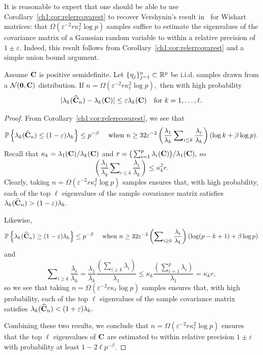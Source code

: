 It is reasonable to expect that one should be able to use Corollary~\ref{ch1:cor:relerrcovarest} 
to recover Vershynin's result in~\cite{Ver10} for Wishart 
matrices: that $\Omega(\varepsilon^{-2} r \kappa_\ell^2 \log p)$ samples suffice to estimate the 
eigenvalues of the covariance matrix of a Gaussian random variable to within a relative precision of 
$1 \pm \varepsilon.$ Indeed, this result follows
from Corollary~\ref{ch1:cor:relerrcovarest} and a simple union bound argument.

\begin{cor}
Assume $\mathbf{C}$ is positive semidefinite. Let $\{\mathbf{\eta}_j\}_{j=1}^n \subset
\mathbb{R}^p$ be i.i.d. samples drawn from a $\mathcal{N}(\mathbf{0}, \mathbf{C})$
distribution. If $n = \Omega(\varepsilon^{-2} r \kappa_\ell^2 \log p),$ then with high probability
\[
|\lambda_k(\widehat{\mathbf{C}}_n) - \lambda_k(\mathbf{C})| \leq \varepsilon
\lambda_k(\mathbf{C}) \quad \text{for } k=1, \ldots,\ell.
\]
\label{ch1:cor:examplecovarest}
\end{cor}

\begin{proof}
 From Corollary~\ref{ch1:cor:relerrcovarest}, we see that 
 \[
  \mathbb{P}\left\{\lambda_k(\widehat{\mathbf{C}}_n) \leq (1-\varepsilon) \lambda_k\right\} \leq p^{-\beta} 
  \quad \text{ when } n \geq 32 \varepsilon^{-2} 
  \left(\frac{\lambda_1}{\lambda_k} \sum\nolimits_{i \leq k} \frac{\lambda_i}{\lambda_k} \right)
  (\log k + \beta \log p).
 \]
Recall that $\kappa_k = \lambda_1(\mathbf{C})/\lambda_k(\mathbf{C})$ and 
$r = \big(\sum_{i=1}^p \lambda_i(\mathbf{C})\big)/\lambda_1(\mathbf{C}),$ so
\[
  \left(\frac{\lambda_1}{\lambda_k} \sum\nolimits_{i \leq k} 
   \frac{\lambda_i}{\lambda_k} \right) \leq \kappa_k^2 r.
\]
Clearly, taking $n = \Omega(\varepsilon^{-2} r \kappa_\ell^2 \log p)$ samples ensures that, 
with high probability, each of the top $\ell$ eigenvalues of the sample covariance matrix
satisfies $\lambda_k(\widehat{\mathbf{C}}_n) > (1 - \varepsilon)\lambda_k.$

Likewise,
\[
 \mathbb{P}\left\{\lambda_k(\widehat{\mathbf{C}}_n) \geq (1-\varepsilon) \lambda_k\right\} \leq p^{-\beta} 
 \quad \text{ when } n \geq 32 \varepsilon^{-2} 
 \left( \sum\nolimits_{i \geq k} \frac{\lambda_i}{\lambda_k} \right)
 (\log (p-k+1) + \beta \log p)
\]
and
\[
 \sum\nolimits_{i \geq k} \frac{\lambda_i}{\lambda_k} = \frac{\lambda_1}{\lambda_k} \frac{\left(\sum\nolimits_{i \geq k} \lambda_i\right)}{\lambda_1} \leq 
 \kappa_k \frac{\left(\sum\nolimits_{i=1}^p \lambda_i\right)}{\lambda_1} = \kappa_k r,
\]
so we see that taking $n = \Omega(\varepsilon^{-2} r \kappa_\ell \log p)$ samples ensures that, 
with high probability, each of the top $\ell$ eigenvalues of the sample covariance matrix 
satisfies $\lambda_k(\widehat{\mathbf{C}}_n) < (1 + \varepsilon)\lambda_k.$

Combining these two results, we conclude that $n = \Omega(\varepsilon^{-2} r \kappa_\ell^2 \log p)$ 
ensures that the top $\ell$ eigenvalues of $\mathbf{C}$ are estimated to within relative precision 
$1 \pm \varepsilon$ with probability at least $1 - 2\ell p^{-\beta}.$
\end{proof}

